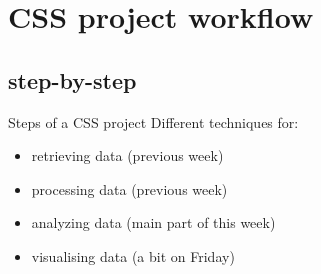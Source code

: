 \documentclass[handout]{beamer}
\begin{document}
\section{CSS project workflow}
\subsection{step-by-step}
\begin{frame}{Steps of a CSS project}
Different techniques for:
\begin{itemize}
	\item retrieving data (previous week)
	\item processing data (previous week)
	\item analyzing data (main part of this week)
	\item visualising data (a bit on Friday)
\end{itemize}

\end{frame}
\end{document}
